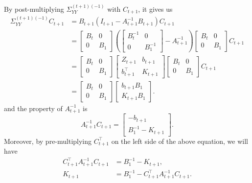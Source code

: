 By post-multiplying $\Sigma_{YY}^{\left(t+1\right)\left(-1\right)}$ with $C_{t+1}$, it gives us
\begin{align*}
\Sigma_{YY}^{\left(t+1\right)\left(-1\right)} C_{t+1} &=  B_{t+1} \left(I_{t+1} -A_{t+1} ^{-1}B_{t+1} \right) C_{t+1}  \\ 
&= \begin{bmatrix} B_t & 0 \\ 0 & B_1 \end{bmatrix} \left( \begin{bmatrix} B_t^{-1} & 0 \\ 0 & B_1^{-1} \end{bmatrix}  -A_{t+1}^{-1} \right) \begin{bmatrix} B_t & 0 \\ 0 & B_1 \end{bmatrix}   C_{t+1}\\
&= \begin{bmatrix} B_t & 0 \\ 0 & B_1 \end{bmatrix}\begin{bmatrix} Z_{t+1} & b_{t+1} \\ b_{t+1}^\top  & K_{t+1} \end{bmatrix}  \begin{bmatrix} B_t & 0 \\ 0 & B_1 \end{bmatrix}   C_{t+1}\\
& = \begin{bmatrix} B_t & 0 \\ 0 & B_1 \end{bmatrix}\begin{bmatrix} b_{t+1}B_1\\ K_{t+1}B_1 \end{bmatrix}.
\end{align*}
and the property of $A_{t+1}^{-1}$ is 
\begin{equation*}
A_{t+1}^{-1}C_{t+1} = \begin{bmatrix}
-b_{t+1} \\ B_1^{-1} - K_{t+1}
\end{bmatrix}.
\end{equation*}
Moreover, by pre-multiplying $C_{t+1}^\top$ on the left side of the above equation, we will have 
\begin{align}
C_{t+1}^\top A_{t+1}^{-1}C_{t+1}  &= B_1^{-1} -K_{t+1},\\
K_{t+1} &= B_1^{-1} - C_{t+1}^\top A_{t+1}^{-1}C_{t+1}.\label{OUKtp1}
\end{align}



